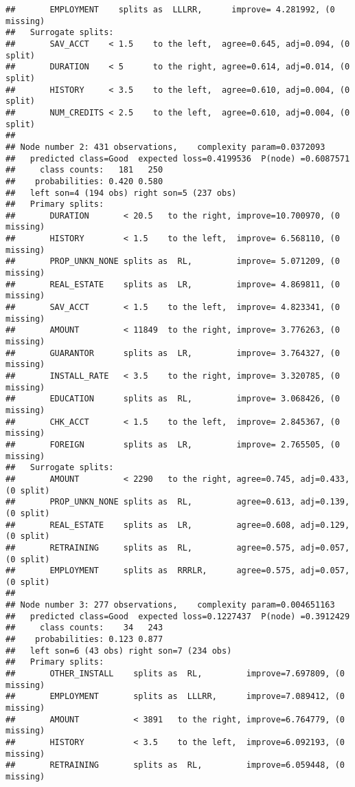 \documentclass[
]{article}
\begin{document}
\begin{verbatim}
##       EMPLOYMENT    splits as  LLLRR,      improve= 4.281992, (0 missing)
##   Surrogate splits:
##       SAV_ACCT    < 1.5    to the left,  agree=0.645, adj=0.094, (0 split)
##       DURATION    < 5      to the right, agree=0.614, adj=0.014, (0 split)
##       HISTORY     < 3.5    to the left,  agree=0.610, adj=0.004, (0 split)
##       NUM_CREDITS < 2.5    to the left,  agree=0.610, adj=0.004, (0 split)
## 
## Node number 2: 431 observations,    complexity param=0.0372093
##   predicted class=Good  expected loss=0.4199536  P(node) =0.6087571
##     class counts:   181   250
##    probabilities: 0.420 0.580 
##   left son=4 (194 obs) right son=5 (237 obs)
##   Primary splits:
##       DURATION       < 20.5   to the right, improve=10.700970, (0 missing)
##       HISTORY        < 1.5    to the left,  improve= 6.568110, (0 missing)
##       PROP_UNKN_NONE splits as  RL,         improve= 5.071209, (0 missing)
##       REAL_ESTATE    splits as  LR,         improve= 4.869811, (0 missing)
##       SAV_ACCT       < 1.5    to the left,  improve= 4.823341, (0 missing)
##       AMOUNT         < 11849  to the right, improve= 3.776263, (0 missing)
##       GUARANTOR      splits as  LR,         improve= 3.764327, (0 missing)
##       INSTALL_RATE   < 3.5    to the right, improve= 3.320785, (0 missing)
##       EDUCATION      splits as  RL,         improve= 3.068426, (0 missing)
##       CHK_ACCT       < 1.5    to the left,  improve= 2.845367, (0 missing)
##       FOREIGN        splits as  LR,         improve= 2.765505, (0 missing)
##   Surrogate splits:
##       AMOUNT         < 2290   to the right, agree=0.745, adj=0.433, (0 split)
##       PROP_UNKN_NONE splits as  RL,         agree=0.613, adj=0.139, (0 split)
##       REAL_ESTATE    splits as  LR,         agree=0.608, adj=0.129, (0 split)
##       RETRAINING     splits as  RL,         agree=0.575, adj=0.057, (0 split)
##       EMPLOYMENT     splits as  RRRLR,      agree=0.575, adj=0.057, (0 split)
## 
## Node number 3: 277 observations,    complexity param=0.004651163
##   predicted class=Good  expected loss=0.1227437  P(node) =0.3912429
##     class counts:    34   243
##    probabilities: 0.123 0.877 
##   left son=6 (43 obs) right son=7 (234 obs)
##   Primary splits:
##       OTHER_INSTALL    splits as  RL,         improve=7.697809, (0 missing)
##       EMPLOYMENT       splits as  LLLRR,      improve=7.089412, (0 missing)
##       AMOUNT           < 3891   to the right, improve=6.764779, (0 missing)
##       HISTORY          < 3.5    to the left,  improve=6.092193, (0 missing)
##       RETRAINING       splits as  RL,         improve=6.059448, (0 missing)

\end{verbatim}
\end{document}
